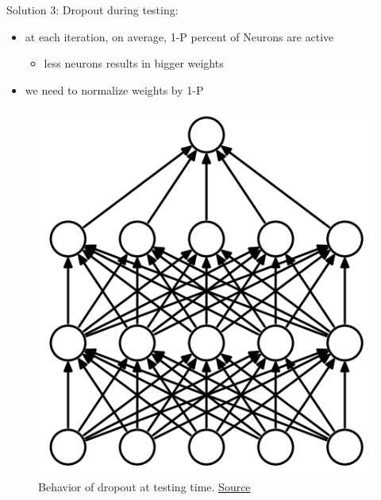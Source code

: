 \begin{frame}{Solution 3: Dropout}
	during testing:
	\begin{itemize}
		\item at each iteration, on average, 1-P percent of Neurons are active
		\begin{itemize}
			\item less neurons results in bigger weights
		\end{itemize}
		\item we need to normalize weights by 1-P
	\end{itemize}
	
	\begin{figure}[H]
		\centering
		\includegraphics[height=0.4\textheight]{Figs/Dropout-before.png}
		\caption{Behavior of dropout at testing time. \href{https://www.cs.toronto.edu/~hinton/absps/JMLRdropout.pdf}{Source}}
	\end{figure}
\end{frame}

